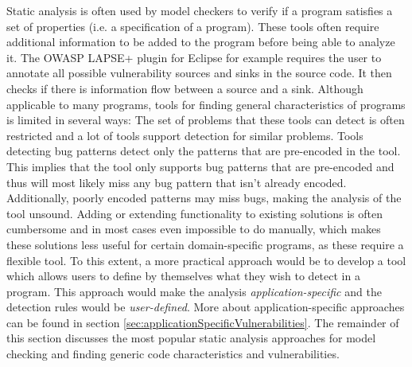 Static analysis is often used by model checkers to verify if a program satisfies a set of properties (i.e. a specification of a program). These tools often require additional information to be added to the program before being able to analyze it. The OWASP LAPSE+ plugin for Eclipse\cite{OWASP:LAPSE} for example requires the user to annotate all possible vulnerability sources and sinks in the source code. It then checks if there is information flow between a source and a sink. Although applicable to many programs, tools for finding general characteristics of programs is limited in several ways:
The set of problems that these tools can detect is often restricted and a lot of tools support detection for similar problems. Tools detecting bug patterns detect only the patterns that are pre-encoded in the tool. This implies that the tool only supports bug patterns that are pre-encoded and thus will most likely miss any bug pattern that isn't already encoded. Additionally, poorly encoded patterns may miss bugs, making the analysis of the tool unsound. Adding or extending functionality to existing solutions is often cumbersome and in most cases even impossible to do manually, which makes these solutions less useful for certain domain-specific programs, as these require a flexible tool. To this extent, a more practical approach would be to develop a tool which allows users to define by themselves what they wish to detect in a program. This approach would make the analysis \textit{application-specific} and the detection rules would be \textit{user-defined}. More about application-specific approaches can be found in section \ref{sec:applicationSpecificVulnerabilities}. The remainder of this section discusses the most popular static analysis approaches for model checking and finding generic code characteristics and vulnerabilities.

